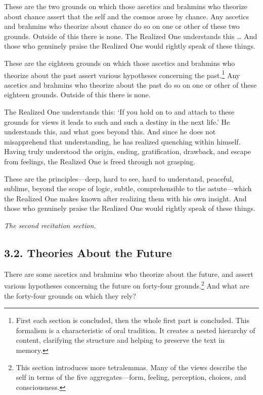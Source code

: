 \documentclass[12pt,openany]{book}%
\newcommand*{\scendsection}[1]{\begin{Center}\begin{small}\textit{#1}\end{small}\end{Center}\addvspace{1em}}
\begin{document}
These are the two grounds on which those ascetics and brahmins who theorize about chance assert that the self and the cosmos arose by chance. Any ascetics and brahmins who theorize about chance do so on one or other of these two grounds. Outside of this there is none. The Realized One understands this … And those who genuinely praise the Realized One would rightly speak of these things. 

These are the eighteen grounds on which those ascetics and brahmins who theorize about the past assert various hypotheses concerning the past.\footnote{First each section is concluded, then the whole first part is concluded. This formalism is a characteristic of oral tradition. It creates a nested hierarchy of content, clarifying the structure and helping to preserve the text in memory. } Any ascetics and brahmins who theorize about the past do so on one or other of these eighteen grounds. Outside of this there is none. 

The Realized One understands this: ‘If you hold on to and attach to these grounds for views it leads to such and such a destiny in the next life.’ He understands this, and what goes beyond this. And since he does not misapprehend that understanding, he has realized quenching within himself. Having truly understood the origin, ending, gratification, drawback, and escape from feelings, the Realized One is freed through not grasping. 

These are the principles—deep, hard to see, hard to understand, peaceful, sublime, beyond the scope of logic, subtle, comprehensible to the astute—which the Realized One makes known after realizing them with his own insight. And those who genuinely praise the Realized One would rightly speak of these things. 

\scendsection{The second recitation section. }

\subsection*{3.2. Theories About the Future }

There are some ascetics and brahmins who theorize about the future, and assert various hypotheses concerning the future on forty-four grounds.\footnote{This section introduces more tetralemmas. Many of the views describe the self in terms of the five aggregates—form, feeling, perception, choices, and consciousness. } And what are the forty-four grounds on which they rely? 
\end{document}
